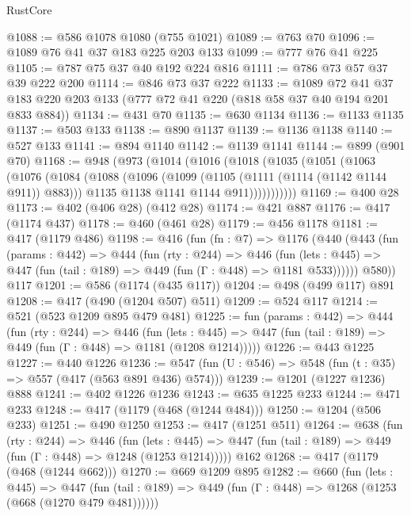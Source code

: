 \begin{lexlean}{RustCore}
\begin{coremodule}
@1088 := @586 @1078 @1080 (@755 @1021)
@1089 := @763 @70
@1096 := @1089 @76 @41 @37 @183 @225 @203 @133
@1099 := @777 @76 @41 @225
@1105 := @787 @75 @37 @40 @192 @224 @816
@1111 := @786 @73 @57 @37 @39 @222 @200
@1114 := @846 @73 @37 @222
@1133 := @1089
    @72
    @41
    @37
    @183
    @220
    @203
    @133
    (@777 @72 @41 @220 (@818 @58 @37 @40 @194 @201 @833 @884))
@1134 := @431 @70
@1135 := @630 @1134
@1136 := @1133 @1135
@1137 := @503 @133
@1138 := @890 @1137
@1139 := @1136 @1138
@1140 := @527 @133
@1141 := @894 @1140
@1142 := @1139 @1141
@1144 := @899 (@901 @70)
@1168 := @948
    (@973
      (@1014
        (@1016
          (@1018
            (@1035
              (@1051
                (@1063
                  (@1076
                    (@1084
                      (@1088
                        (@1096
                          (@1099 (@1105 (@1111 (@1114 (@1142 @1144 @911)) @883)))
                          @1135
                          @1138
                          @1141
                          @1144
                          @911)))))))))))
@1169 := @400 @28
@1173 := @402 (@406 @28) (@412 @28)
@1174 := @421 @887
@1176 := @417 (@1174 @437)
@1178 := @460 (@461 @28)
@1179 := @456 @1178
@1181 := @417 (@1179 @486)
@1198 := @416
    (fun (fn : @7) =>
    @1176
      (@440
        (@443
          (fun (params : @442) =>
          @444
            (fun (rty : @244) =>
            @446
              (fun (lets : @445) =>
              @447 (fun (tail : @189) => @449 (fun (Γ : @448) => @1181 @533))))))
        @580))
    @117
@1201 := @586 (@1174 (@435 @117))
@1204 := @498 (@499 @117) @891
@1208 := @417 (@490 (@1204 @507) @511)
@1209 := @524 @117
@1214 := @521 (@523 @1209 @895 @479 @481)
@1225 := fun (params : @442) =>
  @444
    (fun (rty : @244) =>
    @446
      (fun (lets : @445) =>
      @447 (fun (tail : @189) => @449 (fun (Γ : @448) => @1181 (@1208 @1214)))))
@1226 := @443 @1225
@1227 := @440 @1226
@1236 := @547 (fun (U : @546) => @548 (fun (t : @35) => @557 (@417 (@563 @891 @436) @574)))
@1239 := @1201 (@1227 @1236) @888
@1241 := @402 @1226 @1236
@1243 := @635 @1225 @233
@1244 := @471 @233
@1248 := @417 (@1179 (@468 (@1244 @484)))
@1250 := @1204 (@506 @233)
@1251 := @490 @1250
@1253 := @417 (@1251 @511)
@1264 := @638
    (fun (rty : @244) =>
    @446
      (fun (lets : @445) =>
      @447 (fun (tail : @189) => @449 (fun (Γ : @448) => @1248 (@1253 @1214)))))
    @162
@1268 := @417 (@1179 (@468 (@1244 @662)))
@1270 := @669 @1209 @895
@1282 := @660
    (fun (lets : @445) =>
    @447 (fun (tail : @189) => @449 (fun (Γ : @448) => @1268 (@1253 (@668 (@1270 @479 @481))))))

\end{coremodule}
\end{lexlean}
